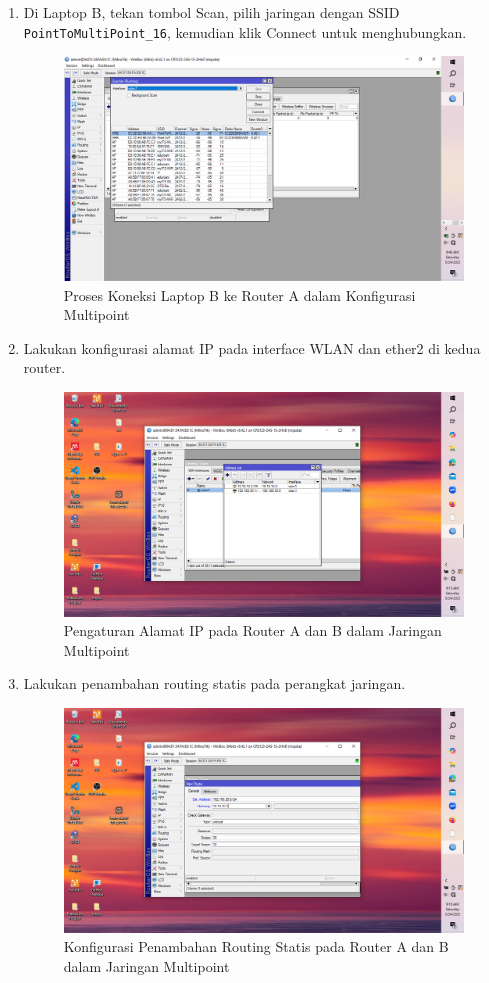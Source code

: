 \begin{enumerate}
    \item Di Laptop B, tekan tombol Scan, pilih jaringan dengan SSID \texttt{PointToMultiPoint\_16}, kemudian klik Connect untuk menghubungkan.
    \begin{figure}[H]
        \centering
        \includegraphics[width=0.5\linewidth]{P3/img/gambar3m.png}
        \caption{Proses Koneksi Laptop B ke Router A dalam Konfigurasi Multipoint}
        \label{fig:hubungkan-laptop-multi}
    \end{figure}

    \item Lakukan konfigurasi alamat IP pada interface WLAN dan ether2 di kedua router.
    \begin{figure}[H]
        \centering
        \includegraphics[width=0.5\linewidth]{P3/img/gambar4.png}
        \caption{Pengaturan Alamat IP pada Router A dan B dalam Jaringan Multipoint}
        \label{fig:ip-router-multi}
    \end{figure}

    \item Lakukan penambahan routing statis pada perangkat jaringan.
    \begin{figure}[H]
        \centering
        \includegraphics[width=0.5\linewidth]{P3/img/gambar5.png}
        \caption{Konfigurasi Penambahan Routing Statis pada Router A dan B dalam Jaringan Multipoint}
        \label{fig:routing-multi}
    \end{figure}


\end{enumerate}

